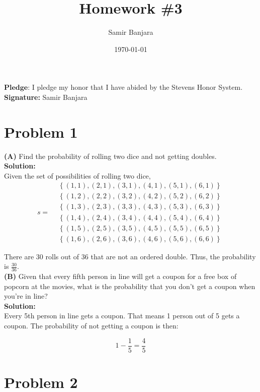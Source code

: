 \documentclass{article}
\title{Homework \#3}
\author{Samir Banjara}
\date{\today}
\begin{document}
    \maketitle
\noindent
\(\textbf{Pledge:}\)
 I pledge my honor that I have abided by the Stevens Honor System.
\noindent
\textbf{Signature:} Samir Banjara

\section*{Problem 1}

\textbf{(A)} Find the probability of rolling two dice and not getting doubles.\\

\textbf{Solution:}
\vspace{1em} \\
Given the set of possibilities of rolling two dice,
\[
s = 
\begin{aligned}
&\left\{(1,1), (2,1), (3, 1), (4, 1), (5, 1), (6, 1)\right\}  \\
&\left\{(1,2), (2,2), (3, 2), (4, 2), (5, 2), (6, 2)\right\}  \\
&\left\{(1,3), (2, 3), (3, 3), (4, 3), (5, 3), (6, 3)\right\} \\
&\left\{(1, 4), (2, 4), (3, 4), (4, 4), (5, 4), (6, 4)\right\} \\
&\left\{(1, 5), (2, 5), (3, 5), (4, 5), (5, 5), (6, 5)\right\} \\
&\left\{(1, 6), (2, 6), (3, 6), (4, 6), (5, 6), (6, 6)\right\}
\end{aligned}
\]

There are 30 rolls out of 36 that are not an ordered double. Thus, the probability is \( \frac{30}{36} \).\\

\vspace{1em}
\textbf{(B)} Given that every fifth person in line will get a coupon for a free box of popcorn at the movies, what is the probability that you don’t get a coupon when you’re in line?\\

\textbf{Solution:}
\vspace{1em} \\
Every 5th person in line gets a coupon. That means 1 person out of 5 gets a coupon. The probability of not getting a coupon is then:

\[
1 - \frac{1}{5} = \frac{4}{5}
\]

\section*{Problem 2}
\end{document}

